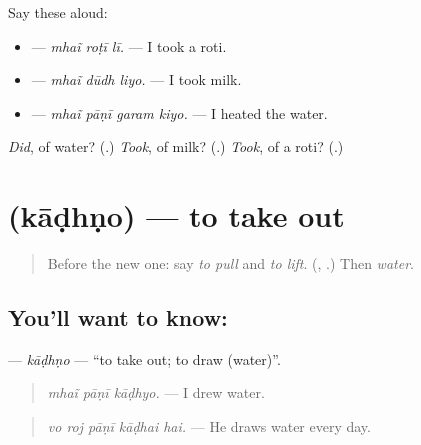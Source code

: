 Say these aloud:

\begin{itemize}
\raggedright
  \item \textbf{  } — \emph{mhaĩ roṭī lī.} — I took a roti.
  \item \textbf{  } — \emph{mhaĩ dūdh liyo.} — I took milk.
  \item \textbf{   } — \emph{mhaĩ pāṇī garam kiyo.} — I heated the water.
\end{itemize}

\begin{tcolorbox}[breakable,colback=teal!4,colframe=teal!35!black,title={Before you move on}]
\emph{Did}, of water? (\textbf{}.) \emph{Took}, of milk? (\textbf{}.) \emph{Took}, of a roti? (\textbf{}.)
\end{tcolorbox}
\section[\texorpdfstring{\mw{काढणो} (kāḍhṇo)}{काढणो (kāḍhṇo)}]{ (kāḍhṇo) — to take out}

\label{lesson:MW-C161-kadhno}



\begin{quote}
Before the new one: say \emph{to pull} and \emph{to lift}. (\textbf{}, \textbf{}.) Then \emph{water}.
\end{quote}

\subsection*{You'll want to know: }
\textbf{} — \emph{kāḍhṇo} — \textquotedblleft{}to take out; to draw (water)\textquotedblright{}.

\begin{quote}
\textbf{  }
\end{quote}

\begin{quote}
\emph{mhaĩ pāṇī kāḍhyo.} — I drew water.
\end{quote}

\begin{quote}
\textbf{    }
\end{quote}

\begin{quote}
\emph{vo roj pāṇī kāḍhai hai.} — He draws water every day.
\end{quote}

